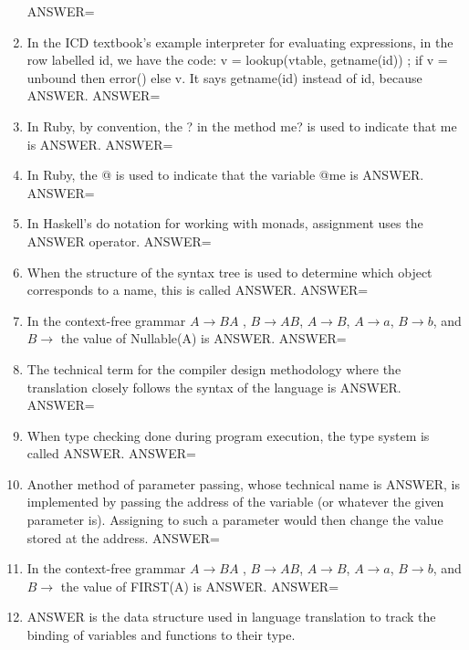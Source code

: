 \documentclass{exam}
\begin{document}
\begin{enumerate}
ANSWER=
\item In the ICD textbook's example interpreter for evaluating expressions, in the row labelled id, we have the code: v = lookup(vtable, getname(id)) ; if v = unbound then error() else v.  It says getname(id) instead of id, because ANSWER.\newline
ANSWER=
\item In Ruby, by convention, the ? in the method me? is used to indicate that me is ANSWER.\newline
ANSWER=
\item In Ruby, the @ is used to indicate that the variable @me is ANSWER.\newline
ANSWER=
\item In Haskell's do notation for working with monads, assignment uses the ANSWER operator.\newline
ANSWER=
\item When the structure of the syntax tree is used to determine which object corresponds to a name, this is called ANSWER.\newline
ANSWER=
\item In the context-free grammar $A \rightarrow B A$ , $B \rightarrow A B$, $A \rightarrow B$, $A \rightarrow a$, $B \rightarrow b$, and $B \rightarrow$  the value of Nullable(A) is ANSWER.\newline
ANSWER=
\item The technical term for the compiler design methodology where the translation closely follows the syntax of the language is ANSWER.\newline
ANSWER=
\item When type checking done during program execution, the type system is called ANSWER.\newline
ANSWER=
\item Another method of parameter passing, whose technical name is ANSWER, is implemented by passing the address of the variable (or whatever the given parameter is).  Assigning to such a parameter would then change the value stored at the address.\newline
ANSWER=
\item In the context-free grammar $A \rightarrow B A$ , $B \rightarrow A B$, $A \rightarrow B$, $A \rightarrow a$, $B \rightarrow b$, and $B \rightarrow$  the value of FIRST(A) is ANSWER.\newline
ANSWER=
\item ANSWER is the data structure used in language translation to track the binding of variables and functions to their type.\newline

\end{enumerate}
\end{document}

